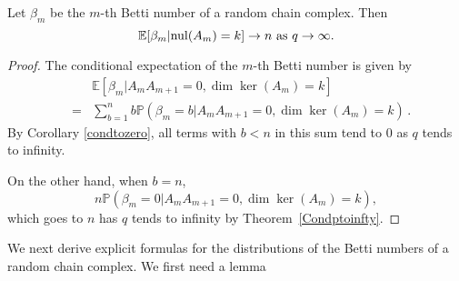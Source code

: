 \begin{corollary}
Let $\beta_m$ be the $m$-th Betti number of a random chain complex.  Then 
\[
\mathbb{E}[\beta_m | \mathrm{nul}(A_{m}) = k ] \to n \textrm{ as } q\to\infty.
\]
\begin{proof}
The conditional expectation of the $m$-th Betti number is given by
	\begin{eqnarray*}
	& & \mathbb{E}[\beta_m | A_{m}A_{m+1} = 0, \dim\ker(A_{m}) = k ]\\
	&=& \sum_{b=1}^n b \mathbb{P}(\beta_m = b | A_{m}A_{m+1} = 0, \dim\ker(A_{m}) = k ) \, .
	\end{eqnarray*}
By Corollary \ref{condtozero}, all terms with $b< n$ in this sum tend to 
$0$ as $q$ tends to infinity. 

On the other hand, when $b=n$, 
\[
n\mathbb{P}(\beta_m=0| A_{m}A_{m+1} = 0, \dim\ker(A_{m}) = k ),
\]
which goes to $n$ has $q$ tends to infinity by Theorem~\ref{Condptoinfty}.
\end{proof}
\end{corollary}

We next derive explicit formulas for the distributions of the Betti numbers of a random chain complex. We first need a lemma

